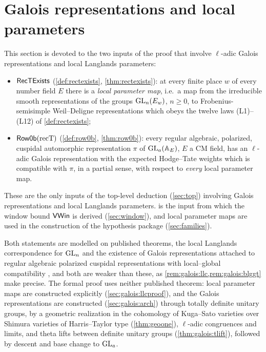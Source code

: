 \section{Galois representations and local parameters}\label{sec:galois}

\providecommand{\galoisWD}{\mathrm{WD}}
\providecommand{\galoisIrr}{\operatorname{Irr}}
\providecommand{\galoisrc}{\mathrm{rc}}
\providecommand{\galoisSp}{\operatorname{Sp}}
\providecommand{\galoisHT}{\mathrm{HT}}
\providecommand{\galoisinf}{\operatorname{inf}}
\providecommand{\galoisrecT}{\mathrm{recT}}
\providecommand{\galoisU}{\mathrm{U}}

This section is devoted to the two inputs of the proof that involve $\ell$-adic Galois
representations and local Langlands parameters:
\begin{itemize}[nosep]
\item $\mathsf{RecTExists}$ (\cref{def:rectexists}, \cref{thm:rectexists}): at every finite place
  $w$ of every number field $E$ there is a \emph{local parameter map}, i.e.\ a map from the
  irreducible smooth representations of the groups $\operatorname{GL}_n(E_w)$, $n\ge0$, to Frobenius-semisimple
  Weil--Deligne representations which obeys the twelve laws (L1)--(L12) of \cref{def:rectexists};
\item $\sfname{Row0b}(\galoisrecT)$ (\cref{def:row0b}, \cref{thm:row0b}): every regular algebraic,
  polarized, cuspidal automorphic representation $\pi$ of $\operatorname{GL}_a(\mathbb{A}_E)$, $E$ a CM field, has an
  $\ell$-adic Galois representation with the expected Hodge--Tate weights which is compatible with
  $\pi$, in a partial sense, with respect to \emph{every} local parameter map.
\end{itemize}
These are the only inputs of the top-level deduction (\cref{sec:top}) involving Galois
representations and local Langlands parameters.  is the input from which the window
bound $\mathsf{VWin}$ is derived (\cref{sec:window}), and local parameter maps are used in the
construction of the hypothesis package (\cref{sec:families}).

Both statements are modelled on published theorems, the local Langlands correspondence for $\operatorname{GL}_n$
\cite{HarrisTaylor2001,Henniart2000,Scholze2013} and the existence of Galois representations attached
to regular algebraic polarized cuspidal representations with local--global compatibility
\cite{HarrisTaylor2001,TaylorYoshida2007,Shin2011,ChenevierHarris2013,Caraiani2012,Caraiani2014,BarnetLambEtAl2014},
and both are weaker than these, as \cref{rem:galois:llc,rem:galois:blggt} make precise. The formal
proof \cite{LeanSource2026} uses neither published theorem: local parameter maps are
constructed explicitly (\cref{sec:galois:llcproof}), and the Galois representations are constructed
(\cref{sec:galois:arch}) through totally definite unitary groups, by a geometric realization in the
cohomology of Kuga--Sato varieties over Shimura varieties of Harris--Taylor type (\cref{thm:geoone}),
$\ell$-adic congruences and limits, and theta lifts between definite unitary groups
(\cref{thm:galois:tlift}), followed by descent and base change to $\operatorname{GL}_a$.

